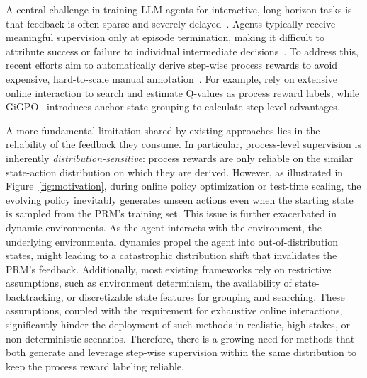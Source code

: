 \documentclass{article}
\theoremstyle{plain}
\theoremstyle{definition}
\theoremstyle{remark}
\begin{document}
A central challenge in training LLM agents for interactive, long-horizon tasks is that feedback is often sparse and severely delayed~\cite{lin2025qlass,gigpo}. Agents typically receive meaningful supervision only at episode termination, making it difficult to attribute success or failure to individual intermediate decisions~\citep{rudder,randomized_return_decomposition,grd}.
To address this, recent efforts aim to automatically derive step-wise process rewards to avoid expensive, hard-to-scale manual annotation~\citep{lightman2023let, ma2023let}. For example, \citet{wang2024math, wang2024multi, lin2025qlass} rely on extensive online interaction to search and estimate Q-values as process reward labels, while GiGPO~\citep{gigpo} introduces anchor-state grouping to calculate step-level advantages. 



A more fundamental limitation shared by existing approaches lies in the reliability of the feedback they consume. In particular, process-level supervision is inherently \emph{distribution-sensitive}: process rewards are only reliable on the similar state-action distribution on which they are derived. However, as illustrated in Figure~\ref{fig:motivation}, during online policy optimization or test-time scaling, the evolving policy inevitably generates unseen actions even when the starting state is sampled from the PRM's training set. 
This issue is further exacerbated in dynamic environments. As the agent interacts with the environment, the underlying environmental dynamics propel the agent into out-of-distribution states, might leading to a catastrophic distribution shift that invalidates the PRM's feedback.
Additionally, most existing frameworks rely on restrictive assumptions, such as environment determinism, the availability of state-backtracking, or discretizable state features for grouping and searching. 
These assumptions, coupled with the requirement for exhaustive online interactions, significantly hinder the deployment of such methods in realistic, high-stakes, or non-deterministic scenarios.
Therefore, there is a growing need for methods that both generate and leverage step-wise supervision within the same distribution to keep the process reward labeling reliable.
\end{document}
